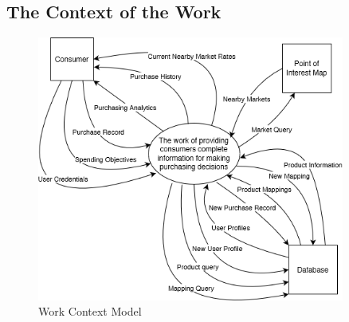 \documentclass[12pt]{article}
\begin{document}
\subsection{The Context of the Work}
\begin{figure}[H]
    \centering
    \includegraphics[width=0.9\textwidth]{workcontext}
    \caption{Work Context Model}
    \label{fig:workcontext}
\end{figure}
\end{document}
